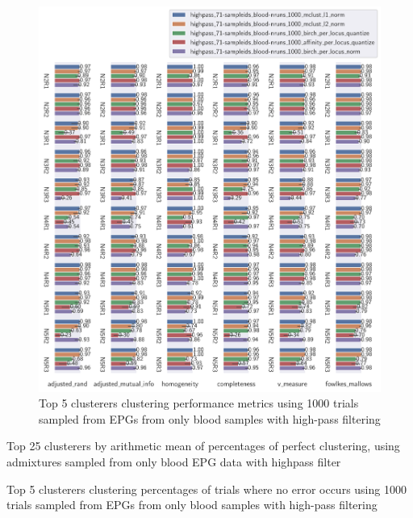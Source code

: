 \begin{theappendices}
\begin{figure}[htbp]
\centering
\includegraphics[width=\textwidth]{./figures/clust_comparison/highpass_71-sampleids_blood-nruns_1000_top_5_clusterers_by_metrics.pdf}
\caption{Top 5 clusterers clustering performance metrics using 1000 trials sampled from EPGs from only blood samples with high-pass filtering}
\label{appendix:fig:highpass_71-sampleids_blood-nruns_1000_top_5_clusterers_by_metrics}
\end{figure}

\begin{table}[htbp]
\centering
{}
\caption{Top 25 clusterers by arithmetic mean of percentages of perfect clustering, using admixtures sampled from only blood EPG data with highpass filter}
\label{appendix:table:top_25_not_ensemble_clusterers_by_binomial_confidence_highpass_71-sampleids_blood-nruns_1000}
\end{table}

\begin{table}[htbp]
\centering
{}
\caption{Top 5 clusterers clustering percentages of trials where no error occurs using 1000 trials sampled from EPGs from only blood samples with high-pass filtering}
\label{appendix:table:highpass_71-sampleids_blood-nruns_1000_top_5_clusterers_by_binomial_confidence}
\end{table}


\end{theappendices}
